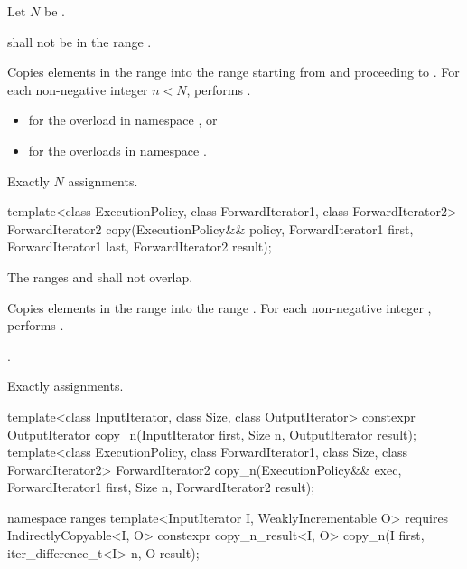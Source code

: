 \begin{itemdescr}
\pnum
Let $N$ be .

\pnum
\requires
{} shall not be in the range .

\pnum
\effects
Copies elements in the range 
into the range 
starting from  and proceeding to .
For each non-negative integer $n < N$,
performs .

\pnum
\returns
\begin{itemize}
\item
   for the overload in namespace , or
\item
   for the overloads in namespace .
\end{itemize}

\pnum
\complexity
Exactly $N$ assignments.
\end{itemdescr}

%
\begin{itemdecl}
template<class ExecutionPolicy, class ForwardIterator1, class ForwardIterator2>
  ForwardIterator2 copy(ExecutionPolicy&& policy,
                        ForwardIterator1 first, ForwardIterator1 last,
                        ForwardIterator2 result);
\end{itemdecl}

\begin{itemdescr}
\pnum
\requires
The ranges  and 
shall not overlap.

\pnum
\effects
Copies elements in the range 
into the range .
For each non-negative integer ,
performs .

\pnum
\returns
{}.

\pnum
\complexity
Exactly  assignments.
\end{itemdescr}

%
\begin{itemdecl}
template<class InputIterator, class Size, class OutputIterator>
  constexpr OutputIterator copy_n(InputIterator first, Size n,
                                  OutputIterator result);
template<class ExecutionPolicy, class ForwardIterator1, class Size, class ForwardIterator2>
  ForwardIterator2 copy_n(ExecutionPolicy&& exec,
                          ForwardIterator1 first, Size n,
                          ForwardIterator2 result);

namespace ranges {
  template<InputIterator I, WeaklyIncrementable O>
    requires IndirectlyCopyable<I, O>
    constexpr copy_n_result<I, O>
      copy_n(I first, iter_difference_t<I> n, O result);
}
\end{itemdecl}

